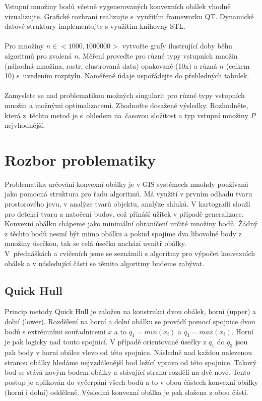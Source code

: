 \documentclass{article}
\begin{document}
Vstupní množiny bodů včetně vygenerovaných konvexních obálek vhodně vizualizujte. Grafické rozhraní realizujte s~využitím frameworku QT. Dynamické datové struktury implementujte s využitím knihovny STL.\\
\\
Pro množiny $n\in <1000,1000000>$ vytvořte grafy ilustrující doby běhu algoritmů pro zvolená $n$. Měření proveďte pro různé typy vstupních množin (náhodná množina, rastr, clustrovaná data) opakovaně (10x) a různá $n$ (celkem 10) s~uvedením rozptylu. Naměřené údaje uspořádejte do přehledných tabulek.\\
\\
Zamyslete se nad problematikou možných singularit pro různé typy vstupních množin a možnými optimalizacemi. Zhodnoťte dosažené výsledky. Rozhodněte, která z~těchto metod je s~ohledem na~časovou složitost a typ vstupní množiny $P$ nejvhodnější.

\section{Rozbor problematiky}
Problematika určování konvexní obálky je v GIS systémech mnohdy používaná jako pomocná struktura pro řadu algoritmů. Má využití v prvním odhadu tvaru prostorového jevu, v analýze tvarů objektu, analýze shluků. V kartografii slouží pro detekci tvaru a natočení budov, což přináší užitek v případě generalizace.\\

Konvexní obálku chápeme jako minimální ohraničení určité množiny bodů. Žádný z těchto bodů nesmí být mimo obálku a pokud spojíme dva libovolné body z množiny úsečkou, tak se celá úsečka nachází uvnitř obálky.\\

V~přednáškách a cvičeních jsme se seznámili s algoritmy  pro výpočet konvexních obálek a v následující části se těmito algoritmy budeme zabývat.

\subsection{Quick Hull}
Princip metody Quick Hull je založen na konstrukci dvou obálek, horní (upper) a dolní (lower). Rozdělení na horní a dolní obálku se provádí pomocí spojnice dvou bodů s extrémními souřadnicemi $x$ a to $q_1 = min(x_i)$ a $q_3 = max(x_i)$. Horní je pak logicky nad touto spojnicí. V případě orientované úsečky z $q_1$ do $q_3$ jsou pak body v horní obálce vlevo od této spojnice. Následně nad každou nalezenou stranou obálky hledáme nejvzdálenější bod ležící vpravo od této spojnice. Takový bod se stává novým bodem obálky a stávající stranu rozdělí na dvě nové. Tento postup je aplikován do vyčerpání všech bodů a to v obou částech konvexní obálky (horní i dolní) odděleně. Výsledná konvexní obálka je pak složena z obou částí.
\end{document}
